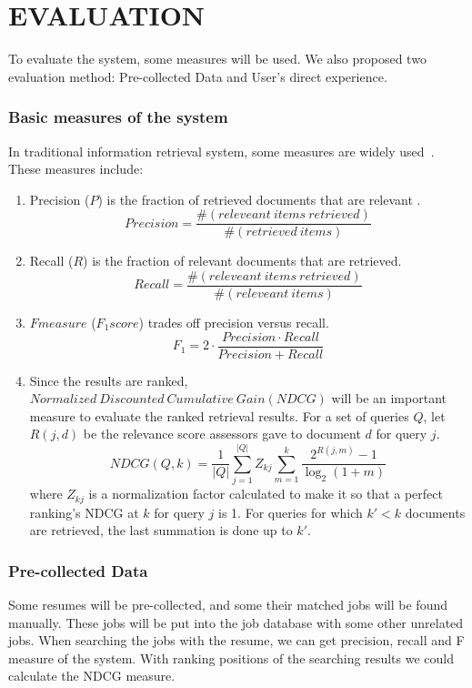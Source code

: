 \chapter{EVALUATION}

To evaluate the system, some measures will be used. We also proposed two evaluation method: Pre-collected Data and User's direct experience.

\subsection{Basic measures of the system}

In traditional information retrieval system, some measures are widely used~\cite{manning2008introduction}. These measures include:

\begin{enumerate}
    \item Precision ($P$) is the fraction of retrieved documents that are relevant .
       $$  Precision =  \frac{ \#(releveant~items~ retrieved)}{ \#(retrieved~items)}$$
    \item Recall ($R$) is the fraction of relevant documents that are retrieved.
       $$  Recall =  \frac{ \#(releveant~items~ retrieved)}{ \#(releveant~items)}$$
    \item $F measure$ ($F_1 score$) trades off precision versus recall.
       $$ F_1 = 2 \cdot \frac{ Precision \cdot Recall}{ Precision + Recall } $$
    \item Since the results are ranked, $ Normalized~Discounted~Cumulative~Gain ( NDCG )$ will be an important measure to evaluate the ranked retrieval results. For a set of queries $Q$, let $R(j,d)$ be the relevance score assessors gave to document $d$ for query $j$.
       $$ NDCG(Q,k) = \frac {1}{|Q|} \sum_{j=1}^{|Q|}{Z_{kj}} \sum_{m=1}^{k} \frac{2^{R(j,m)} - 1}{ \log_2(1+m)} $$
where $Z_{kj}$ is a normalization factor calculated to make it so that a perfect ranking's NDCG at $k$ for query $j$ is 1. For queries for which $k' < k$ documents are retrieved, the last summation is done up to $k'$.

\end{enumerate}

\subsection{Pre-collected Data}

Some resumes will be pre-collected, and some their matched jobs will be found manually. These jobs will be put into the job database with some other unrelated jobs.  When searching the jobs with the resume, we can get precision, recall and F measure of the system. With ranking positions of the searching results we could calculate the NDCG measure.

